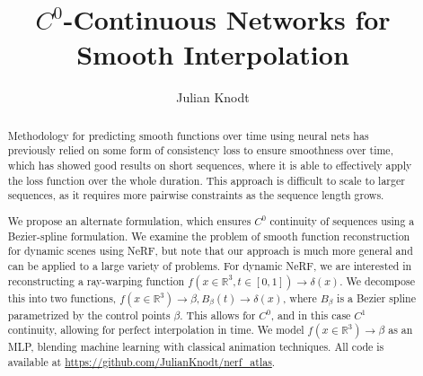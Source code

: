 \documentclass[10pt,twocolumn,letterpaper]{article}
\begin{document}
\title{$C^0$-Continuous Networks for Smooth Interpolation}
\author{Julian Knodt}

\maketitle

\begin{abstract}
Methodology for predicting smooth functions over time using neural nets has previously relied on
some form of consistency loss to ensure smoothness over time, which has showed good results on
short sequences, where it is able to effectively apply the loss function over the whole duration.
This approach is difficult to scale to larger sequences, as it requires more pairwise
constraints as the sequence length grows.

We propose an alternate formulation, which ensures $C^0$ continuity of sequences using a
Bezier-spline formulation. We examine the problem of smooth function reconstruction for dynamic
scenes using NeRF, but note that our approach is much more general and can be applied to a large
variety of problems. For dynamic NeRF, we are interested in reconstructing a ray-warping
function $f(x\in\mathbb{R}^3,t\in[0,1])\to\delta(x)$. We decompose this into two functions,
$f(x\in\mathbb{R}^3)\to\beta, B_\beta(t)\to\delta(x)$, where $B_\beta$ is a Bezier spline
parametrized by the control points $\beta$. This allows for $C^0$, and in this case $C^1$ continuity,
allowing for perfect interpolation in time. We model $f(x\in\mathbb{R}^3)\to\beta$ as an MLP,
blending machine learning with classical animation techniques. All code is available at \url{https://github.com/JulianKnodt/nerf_atlas}.
\end{abstract}
\end{document}
